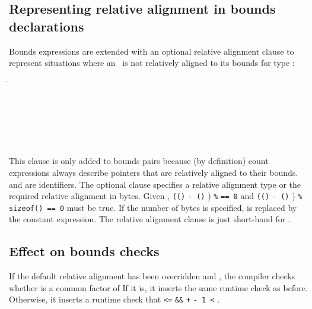 \subsection{Representing relative alignment in bounds declarations}
\label{section:representing-relative-alignment}

Bounds expressions are extended with an optional relative alignment
clause to represent situations where an \arrayptrT\ is not relatively
aligned to its bounds for type :

\begin{tabbing}
\=\\
\> \var{\ldots{}}\\
\> 
          \\
\\
\\
\>  \\
\> 
\end{tabbing}

This clause is only added to bounds pairs because (by definition) count
expressions always describe pointers that are relatively aligned to
their bounds.   and  are
identifiers.  The optional clause specifies a
relative alignment type  or the required relative alignment in
bytes.  Given
,
\lstinline|((|\arrayptrchar\lstinline|)|  \lstinline|- (|\arrayptrchar\lstinline|)| )
        \lstinline|%| \lstinline|== 0| and
\lstinline|((|\arrayptrchar\lstinline|)|  \lstinline|- (|\arrayptrchar\lstinline|)| )
        \lstinline|% sizeof(|\lstinline|) == 0| must be true. If the number of bytes is
specified,  is replaced by the
constant expression.  The relative alignment clause 
is just short-hand for .

\subsection{Effect on bounds checks}

If the default relative alignment has been overridden and
, the compiler checks whether
 is a common factor of 
If it is, it inserts the same
runtime check as before. Otherwise, it inserts a runtime check that
 \lstinline|<=|  \lstinline|&&|
 \lstinline|+|  \lstinline|- 1 <| .

